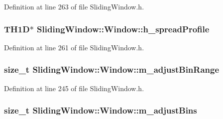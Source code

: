 Definition at line 263 of file Sliding\+Window.\+h.

\subsubsection[{\texorpdfstring{h\+\_\+spread\+Profile}{h_spreadProfile}}]{\setlength{\rightskip}{0pt plus 5cm}T\+H1D$\ast$ Sliding\+Window\+::\+Window\+::h\+\_\+spread\+Profile\hspace{0.3cm}{\ttfamily [protected]}}\hypertarget{classSlidingWindow_1_1Window_a6b488ac4c3f0f5d0562479df27e31dbd}{}\label{classSlidingWindow_1_1Window_a6b488ac4c3f0f5d0562479df27e31dbd}


Definition at line 261 of file Sliding\+Window.\+h.

\subsubsection[{\texorpdfstring{m\+\_\+adjust\+Bin\+Range}{m_adjustBinRange}}]{\setlength{\rightskip}{0pt plus 5cm}size\+\_\+t Sliding\+Window\+::\+Window\+::m\+\_\+adjust\+Bin\+Range\hspace{0.3cm}{\ttfamily [protected]}}\hypertarget{classSlidingWindow_1_1Window_a742d6f030de136c948ef0bd62fd11bb2}{}\label{classSlidingWindow_1_1Window_a742d6f030de136c948ef0bd62fd11bb2}


Definition at line 245 of file Sliding\+Window.\+h.

\subsubsection[{\texorpdfstring{m\+\_\+adjust\+Bins}{m_adjustBins}}]{\setlength{\rightskip}{0pt plus 5cm}size\+\_\+t Sliding\+Window\+::\+Window\+::m\+\_\+adjust\+Bins\hspace{0.3cm}{\ttfamily [protected]}}\hypertarget{classSlidingWindow_1_1Window_a94679f3f59d0fb1cfe3a0ea3992f7198}{}\label{classSlidingWindow_1_1Window_a94679f3f59d0fb1cfe3a0ea3992f7198}


